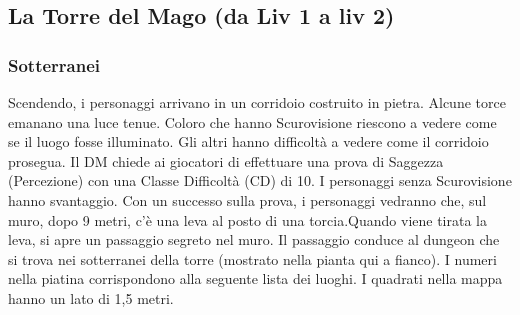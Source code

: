 \documentclass{article}
\begin{document}
\newpage
        \subsection{La Torre del Mago (da Liv 1 a liv 2)}
            \subsubsection{Sotterranei}
Scendendo, i personaggi arrivano in un corridoio costruito in pietra. Alcune torce emanano una luce tenue. Coloro che hanno Scurovisione riescono a vedere come se il luogo fosse illuminato. Gli altri hanno difficoltà a vedere come il corridoio prosegua. Il DM chiede ai giocatori di effettuare una prova di Saggezza (Percezione) con una Classe Difficoltà (CD) di 10. I personaggi senza Scurovisione hanno svantaggio. Con un successo sulla prova, i personaggi vedranno che, sul muro, dopo 9 metri, c'è una leva al posto di una torcia.Quando viene tirata la leva, si apre un passaggio segreto nel muro. Il passaggio conduce al dungeon che si trova nei sotterranei della torre (mostrato nella pianta qui a fianco). I numeri nella piatina corrispondono alla seguente lista dei luoghi. I quadrati nella mappa hanno un lato di 1,5 metri.
\end{document}
